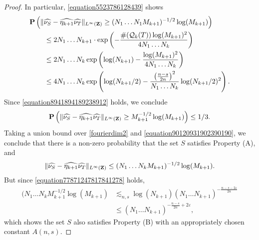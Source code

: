 \begin{proof}
    In particular, \eqref{equation5523786128439} shows
    \begin{align*}
        \operatorname{\mathbf{P}} & \left( \| \widehat{\nu_S} - \widehat{\eta_{k+1}} \widehat{\nu_T} \|_{L^\infty(\operatorname{\mathbf{Z}})} \geq (N_1 \dots N_1 M_{k+1})^{-1/2} \log(M_{k+1}) \right)\\
        &\ \ \ \ \leq 2N_1 \dots N_{k+1} \cdot \exp \left( - \frac{\#(\operatorname{\mathcal{Q}}_k(T)) \log(M_{k+1})^2}{4 N_1 \dots N_k} \right)\\
        &\ \ \ \ \leq 2 N_1 \dots N_k \exp \left( \log(N_{k+1}) - \frac{\log(M_{k+1})^2}{4 N_1 \dots N_k} \right)\\
        &\ \ \ \ \leq 4 N_1 \dots N_k \exp \left( \log(N_{k+1}/2) - \frac{\left( \frac{n-s}{2n} \right)^2}{N_1 \dots N_k} \log(N_{k+1}/2)^2 \right).
    \end{align*}
    Since \eqref{equation8941894189238912} holds, we conclude
    \begin{equation} \label{equation90120931902390190}
        \operatorname{\mathbf{P}} \left( \| \widehat{\nu_S} - \widehat{\eta_{k+1}} \widehat{\nu_T} \|_{L^\infty(\operatorname{\mathbf{Z}})} \geq M_{k+1}^{-1/2} \log(M_{k+1}) \right) \leq 1/3.
    \end{equation}
    Taking a union bound over \eqref{fourierdim2} and \eqref{equation90120931902390190}, we conclude that there is a non-zero probability that the set $S$ satisfies Property (A), and
    \[ \| \widehat{\nu_S} - \widehat{\eta_{k+1}} \widehat{\nu_T} \|_{L^\infty(\operatorname{\mathbf{Z}})} \leq (N_1 \dots N_k M_{k+1})^{-1/2} \log(M_{k+1}). \]
    But since \eqref{equation77871247817841278} holds,
    \begin{align*}
        (N_1 \dots N_k M_{k+1}^{-1/2} \log(M_{k+1}) &\lesssim_{n,s} \log(N_{k+1}) (N_1 \dots N_{k+1})^{- \frac{n-s-2\varepsilon}{2n}}\\
        &\leq (N_1 \dots N_{k+1})^{- \frac{n-s}{2n} + 2\varepsilon},
    \end{align*}
    which shows the set $S$ also satisfies Property (B) with an appropriately chosen constant $A(n,s)$.
\end{proof}

